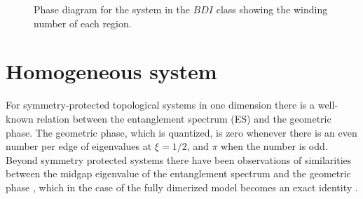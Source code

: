 \documentclass[prb,twocolumn,amsmath,longbibliography,amssymb,superscriptaddress]{revtex4-1}
\begin{document}
\begin{figure}[h!]
\centering
{}
\caption{Phase diagram for the system in the $BDI$ class showing the winding number of each region.}
\label{bdi_phase_diagram}
\end{figure}


\section{Homogeneous system}

For symmetry-protected topological systems in one dimension there is a well-known relation between the entanglement spectrum  (ES) and the geometric phase. The geometric phase, which is quantized, is zero whenever there is an even number per edge of eigenvalues at $\xi = 1/2$, and $\pi$ when the number is odd. Beyond symmetry protected systems there have been observations of similarities between the midgap eigenvalue of the entanglement spectrum and the geometric phase \cite{Ryu2006,Huang2012,Huang2012-2}, which in the case of the fully dimerized model becomes an exact identity \cite{Ryu2006}. 
\end{document}
